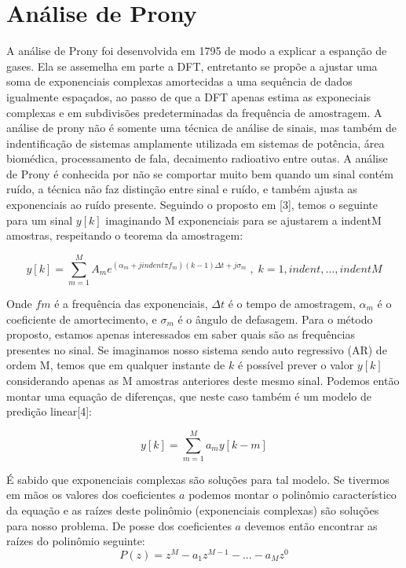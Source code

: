 \documentclass[a4paper, 12pt]{book}
\begin{document}
\section{Análise de Prony}
A análise de Prony foi desenvolvida em 1795 de modo a explicar a espanção de gases. Ela se assemelha em parte a DFT, entretanto se propõe a ajustar uma soma de exponenciais complexas amortecidas a uma sequência de dados igualmente espaçados, ao passo de que a DFT apenas estima as exponeciais complexas e em subdivisões predeterminadas da frequência de amostragem. A análise de prony não é somente uma técnica de análise de sinais, mas também de indentificação de sistemas amplamente utilizada em sistemas de potência, área biomédica, processamento de fala, decaimento radioativo entre outas. 
A análise de Prony é conhecida por não se comportar muito bem quando um sinal contém ruído, a técnica não faz distinção entre sinal e ruído, e também ajusta as exponenciais ao ruído presente.
Seguindo o proposto em [3], temos o seguinte para um sinal $y[k]$ imaginando M exponenciais para se ajustarem a indentM amostras, respeitando o teorema da amostragem:

\Large
\begin{equation}
    y[k]=\sum_{m=1}^{M}A_me^{(\alpha_m+jindent\pi f_m)(k-1)\Delta t +j\sigma_m}\;,\;k=1,indent,...,indentM
\end{equation}
\normalsize

\indent Onde $fm$ é a frequência das exponenciais, $\Delta t$ é o tempo de amostragem, $\alpha _m$ é o coeficiente de amortecimento, e $\sigma _m$ é o ângulo de defasagem. Para o método proposto, estamos apenas interessados em saber quais são as frequências presentes no sinal. Se imaginamos nosso sistema sendo auto regressivo (AR) de ordem M, temos que em qualquer instante de $k$ é possível prever o valor $y[k]$ considerando apenas as M amostras anteriores deste mesmo sinal. Podemos então montar uma equação de diferenças, que neste caso também é um modelo de predição linear[4]:

\begin{equation}
    y[k]=\sum_{m=1}^{M}a_m y[k-m]
\end{equation}

É sabido que exponenciais complexas são soluções para tal modelo. Se tivermos em mãos os valores dos coeficientes $a$ podemos montar o polinômio característico da equação e as raízes deste polinômio (exponenciais complexas) são soluções para nosso problema. De posse dos coeficientes $a$ devemos então encontrar as raízes do polinômio seguinte:
\begin{equation}
    P(z)=z^M-a_1z^{M-1}-...-a_Mz^0
\end{equation}
\end{document}
